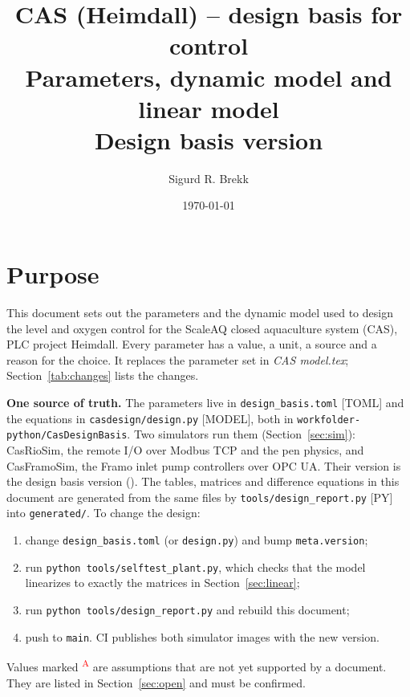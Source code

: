 \documentclass[11pt]{article}
\title{CAS (Heimdall) -- design basis for control\\[1mm]
\large Parameters, dynamic model and linear model\\[1mm]
\normalsize Design basis version \CASVersion}
\author{Sigurd R. Brekk}
\date{\today}
\newcommand{\assumed}{\textsuperscript{\textcolor{red}{A}}}
\begin{document}
\maketitle

\section{Purpose}

This document sets out the parameters and the dynamic model used to design the level and oxygen
control for the ScaleAQ closed aquaculture system (CAS), PLC project Heimdall. Every parameter
has a value, a unit, a source and a reason for the choice. It replaces the parameter set in
\emph{CAS model.tex}; Section~\ref{tab:changes} lists the changes.

\textbf{One source of truth.} The parameters live in \texttt{design\_basis.toml} [TOML] and the
equations in \texttt{casdesign/design.py} [MODEL], both in \texttt{workfolder-python/CasDesignBasis}.
Two simulators run them (Section~\ref{sec:sim}): CasRioSim, the remote I/O over Modbus TCP and the
pen physics, and CasFramoSim, the Framo inlet pump controllers over OPC UA. Their version is the
design basis version (\CASVersion). The tables, matrices and difference equations in this
document are generated from the same files by \texttt{tools/design\_report.py} [PY] into
\texttt{generated/}. To change the design:
\begin{enumerate}
  \item change \texttt{design\_basis.toml} (or \texttt{design.py}) and bump
        \texttt{meta.version};
  \item run \texttt{python tools/selftest\_plant.py}, which checks that the model linearizes to
        exactly the matrices in Section~\ref{sec:linear};
  \item run \texttt{python tools/design\_report.py} and rebuild this document;
  \item push to \texttt{main}. CI publishes both simulator images with the new version.
\end{enumerate}

Values marked \assumed{} are assumptions that are not yet supported by a document. They are
listed in Section~\ref{sec:open} and must be confirmed.
\end{document}
